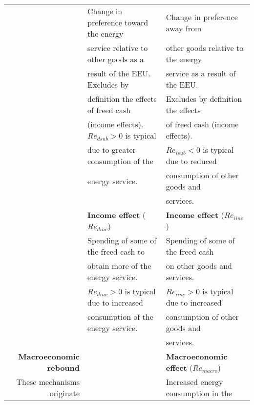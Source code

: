 \begin{table}
\begin{center}
\begin{tabular}{ r l l }
                                   & Change in preference toward the energy       & Change in preference away from  \\
                                   & service relative to other goods as a         & other goods relative to the energy  \\
                                   & result of the EEU. Excludes by               & service as a result of the EEU.  \\
                                   & definition the effects of freed cash         & Excludes by definition the effects \\ 
                                   & (income effects). $Re_{dsub} > 0$ is typical & of freed cash (income effects).     \\ 
                                   & due to greater consumption of the            & $Re_{isub} < 0$ is typical due to reduced    \\
                                   & energy service.                              & consumption of other goods and   \\
                                   &                                              & services. \\
                                   \cmidrule{2-3}
                                   & \textbf{Income effect} ($Re_{dinc}$)         & \textbf{Income effect} ($Re_{iinc}$) \\
                                   & Spending of some of the freed cash to        & Spending of some of the freed cash   \\
                                   & obtain more of the energy service.           & on other goods and services.   \\
                                   & $Re_{dinc} > 0$ is typical due to increased  & $Re_{iinc} > 0$ is typical due to increased    \\ 
                                   & consumption of the energy service.           & consumption of other goods and   \\
                                   &                                              & services. \\
\midrule
\textbf{Macroeconomic rebound}     &                                              & \textbf{Macroeconomic effect} ($Re_{macro}$) \\
These mechanisms originate         &                                              & Increased energy consumption in the  \\

\end{tabular}
\end{center}
\end{table}
